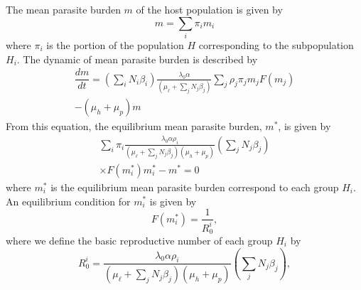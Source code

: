 \documentclass[eng]{MMSB-class-eng}
\begin{document}
{The mean parasite burden $m$ of the host population %
is given by
\begin{equation}
m=\sum_i \pi_i m_{i} 
\end{equation}
where $\pi_i$ is the portion of the population $H$ corresponding to the subpopulation $H_i$. The dynamic of mean parasite burden is described by
\begin{multline}
	\dfrac{dm}{dt}= %
	\left(  \sum_i N_i \beta_{i} \right)
	\frac{ \lambda_0 \alpha }{(\mu_{\ell}+\sum_j N_j \beta_j  )}  
	\sum_j \rho_{j} \pi_{j} m_{j} F(m_{j})\\   -(\mu_{h}+\mu_p) m%
\end{multline}
From this equation, the equilibrium mean parasite burden, $m^*$, is given by
\begin{multline}
	\sum_i \pi_i \frac{ \lambda_0 \alpha \rho_{i}}{ (\mu_{\ell}+\sum_j N_j \beta_j  )(\mu_{h}+\mu_p)} 
	\left( \sum_j N_{j} \beta_{j} \right)\\ 
	\times F( m^*_{i}) m^*_{i}
	- m^*=0 
\end{multline}
where $m_{i}^*$ is the equilibrium mean parasite burden correspond to each group $H_{i}$.
An equilibrium condition for 
$m_{i}^*$
is given by
\begin{equation}%
F(m^*_{i})=\dfrac{1}{R_0^{i}},
\end{equation}
where we define the basic reproductive number of each group $H_i$ by
\begin{equation}%
R_0^{i}=\frac{ \lambda_0 \alpha \rho_{i}}{ (\mu_{\ell}+\sum_j N_j \beta_j )(\mu_{h}+\mu_p)} \left( \sum_j N_j\beta_{j} \right),

\end{equation}}
\end{document}
